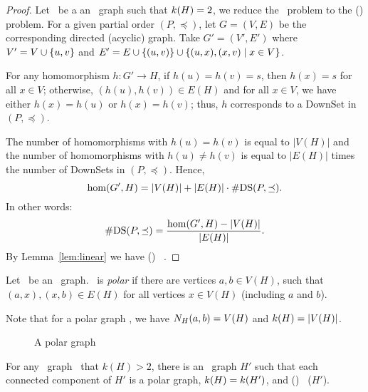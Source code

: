 \begin{proof}
Let \mH\ be a an \RBA\ graph such that \(k(H)=2\), 
we reduce the \cdsp\ problem to the \chom(\mH) problem\@.
For a given partial order \((P,\preceq)\), let \(G=(V,E)\) be the corresponding directed
(acyclic) graph. Take \(G'=(V',E')\) where
\(V'= V \cup \{{u,v}\}\) and \(E' = E \cup \{{(u,v)}\} \cup
\{{(u,x),(x,v) \mid x\in V}\}\)\@.

For any homomorphism \(h: G' \to H\), if \(h(u)=h(v)=s\), then \(h(x)=s\) for all \(x\in V\);
otherwise, \((h(u),h(v))\in E(H)\) and for all \(x\in V\), we have either 
\(h(x)=h(u)\) or \(h(x)=h(v)\); thus,
\(h\) corresponds to a DownSet in \((P,\preceq)\)\@.

The number of homomorphisms with \(h(u)=h(v)\) is equal to \(|V(H)|\) and
the number of homomorphisms with \(h(u)\neq h(v)\) is equal to \(|E(H)|\) times the 
number of DownSets in \((P,\preceq)\)\@. Hence,
\[\hom(G',H) = |V(H)| + |E(H)|\cdot \#\mathrm{DS}(P,\preceq).\]
In other words:
\[\#\mathrm{DS}(P,\preceq) = \frac{\hom(G',H) - |V(H)|}{|E(H)|}.\] 
By Lemma~\ref{lem:linear} we have \chom(\mH) \mapge\ \cdsp\@.
\end{proof}

\begin{defi} 
Let \mH\ be an \RBA\ graph. \mH\ is \emph{polar}
if there are vertices \(a,b\in V(H)\),
such that \((a,x), (x,b) \in E(H)\) for all vertices \(x \in V(H)\) (including \(a\) and \(b\)).
\end{defi}

Note that for a polar graph \mH, we have \(N_{H}({a},{b}) = V(H)\) and \(k(H)=|V(H)|\)\@.

\begin{figure}[h]
\center{}
\caption{A polar graph}
\end{figure}

\begin{lemma} \label{lem:k-fixing}
For any \RBA\ graph \mH\ that \(k(H) > 2\), there is an \RBA\ graph
\(H'\) such that each connected component of \(H'\) is a
polar graph, \(k(H) = k(H')\), and
\chom(\mH) \mapge\ \chom(\(H'\)).
\end{lemma}

